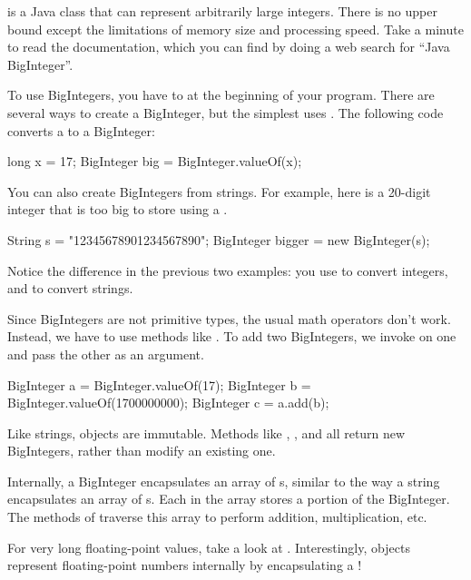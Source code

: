 
 is a Java class that can represent arbitrarily large integers.
There is no upper bound except the limitations of memory size and processing speed.
Take a minute to read the documentation, which you can find by doing a web search for ``Java BigInteger''.


To use BigIntegers, you have to  at the beginning of your program.
There are several ways to create a BigInteger, but the simplest uses .
The following code converts a  to a BigInteger:

\begin{code}
long x = 17;
BigInteger big = BigInteger.valueOf(x);
\end{code}

You can also create BigIntegers from strings.
For example, here is a 20-digit integer that is too big to store using a .

\begin{code}
String s = "12345678901234567890";
BigInteger bigger = new BigInteger(s);
\end{code}

Notice the difference in the previous two examples: you use  to convert integers, and  to convert strings.

Since BigIntegers are not primitive types, the usual math operators don't work.
Instead, we have to use methods like .
To add two BigIntegers, we invoke  on one and pass the other as an argument.

\begin{code}
BigInteger a = BigInteger.valueOf(17);
BigInteger b = BigInteger.valueOf(1700000000);
BigInteger c = a.add(b);
\end{code}

Like strings,  objects are immutable.
Methods like , , and  all return new BigIntegers, rather than modify an existing one.

Internally, a BigInteger encapsulates an array of s, similar to the way a string encapsulates an array of s.
Each  in the array stores a portion of the BigInteger.
The methods of  traverse this array to perform addition, multiplication, etc.

For very long floating-point values, take a look at .
Interestingly,  objects represent floating-point numbers internally by encapsulating a !



